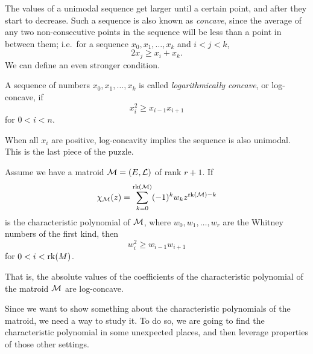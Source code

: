 \documentclass[12pt,oneside]{../../sfsuthesis}
\begin{document}
The values of a unimodal sequence get larger until a certain point, and after they start to decrease.
Such a sequence is also known as \emph{concave}, since the average of any two non-consecutive points in the sequence will be less than a point in between them;
i.e.\ for a sequence \( x_0, x_1, \dots, x_k \) and \( i < j < k \),
\[
    2x_j \geq x_i + x_k.
\]
We can define an even stronger condition.

\begin{definition}\th\label{def:logConcave}
    A sequence of numbers \( x_0, x_1, \dots, x_k \) is called \emph{logarithmically concave}, or log-concave, if
    \[
        x_i^2 \geq x_{i-1} x_{i+1}
    \]
    for \( 0 < i < n \).
\end{definition}

When all \( x_i \) are positive, log-concavity implies the sequence is also unimodal.
This is the last piece of the puzzle.

\begin{theorem}\th\label{thm:HRW}
    Assume we have a matroid \( \mathcal{M} = (E, \mathcal{L}) \) of rank \( r + 1 \).
    If
    \[
        \chi_{\mathcal{M}}(z) = \sum_{k=0}^{\operatorname{rk}(\mathcal{M})} (-1)^k w_k z^{\operatorname{rk}(\mathcal{M}) - k}
    \]
    is the characteristic polynomial of \( \mathcal{M} \), where \( w_0, w_1, \dots, w_r \) are the Whitney numbers of the first kind, then
    \[
        w_i^2 \geq w_{i-1}w_{i+1}
    \]
    for \( 0 < i < \operatorname{rk}(M) \).

    That is, the absolute values of the coefficients of the characteristic polynomial of the matroid \( \mathcal{M} \) are log-concave.
\end{theorem}

Since we want to show something about the characteristic polynomials of the matroid, we need a way to study it.
To do so, we are going to find the characteristic polynomial in some unexpected places, and then leverage properties of those other settings.
\end{document}

